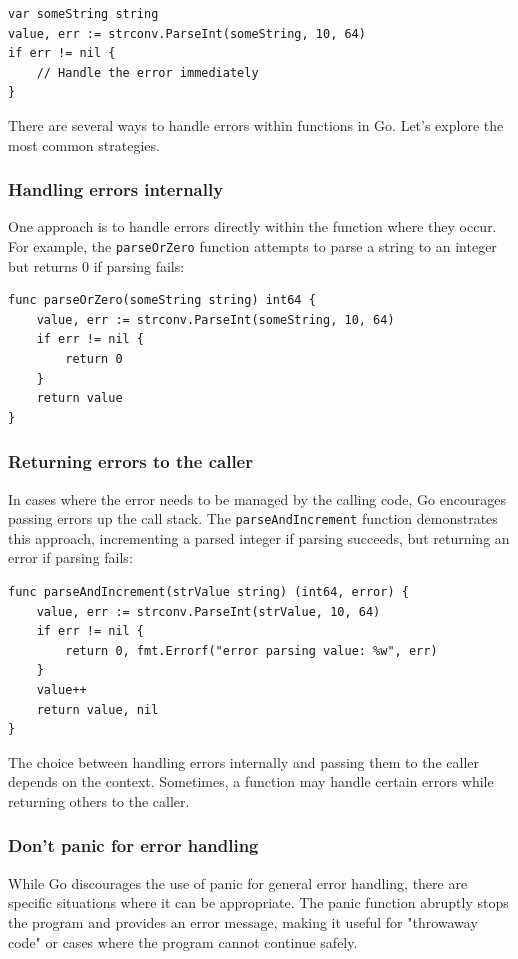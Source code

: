 \begin{verbatim}
var someString string
value, err := strconv.ParseInt(someString, 10, 64)
if err != nil {
    // Handle the error immediately
}
\end{verbatim}

There are several ways to handle errors within functions in Go. Let’s explore the most common strategies.

\subsubsection{Handling errors internally}
One approach is to handle errors directly within the function where they occur. For example, the \texttt{parseOrZero} function attempts to parse a string to an integer but returns 0 if parsing fails:

\begin{verbatim}
func parseOrZero(someString string) int64 {
    value, err := strconv.ParseInt(someString, 10, 64)
    if err != nil {
        return 0
    }
    return value
}
\end{verbatim}

\subsubsection{Returning errors to the caller}
In cases where the error needs to be managed by the calling code, Go encourages passing errors up the call stack. The \texttt{parseAndIncrement} function demonstrates this approach, incrementing a parsed integer if parsing succeeds, but returning an error if parsing fails:

\begin{verbatim}
func parseAndIncrement(strValue string) (int64, error) {
    value, err := strconv.ParseInt(strValue, 10, 64)
    if err != nil {
        return 0, fmt.Errorf("error parsing value: %w", err)
    }
    value++
    return value, nil
}
\end{verbatim}

The choice between handling errors internally and passing them to the caller depends on the context. Sometimes, a function may handle certain errors while returning others to the caller.

\subsubsection{Don't panic for error handling}
While Go discourages the use of panic for general error handling, there are specific situations where it can be appropriate. The panic function abruptly stops the program and provides an error message, making it useful for "throwaway code" or cases where the program cannot continue safely.

